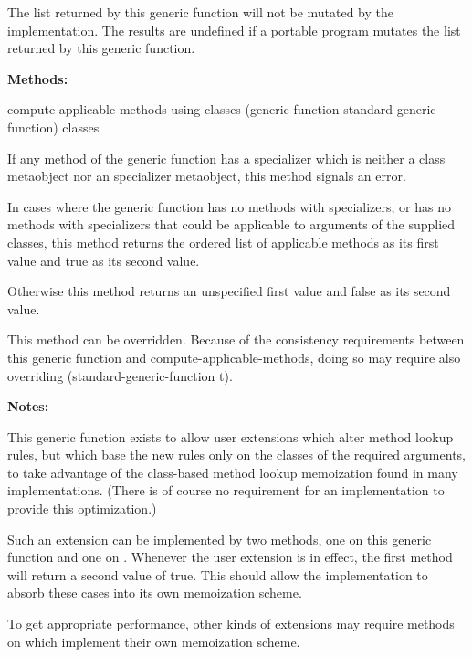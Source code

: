 \begin{defun}
The list returned by this generic function will not be mutated by the
implementation. The results are undefined if a portable program mutates the list
returned by this generic function.

\textbf{Methods:}

\begin{defun}
compute-applicable-methods-using-classes (generic-function standard-generic-function) classes

If any method of the generic function has a specializer which is neither a class
metaobject nor an  specializer metaobject, this method signals an error.

In cases where the generic function has no methods with  specializers, or has
no methods with  specializers that could be applicable to arguments of the
supplied classes, this method returns the ordered list of applicable methods as
its first value and true as its second value.

Otherwise this method returns an unspecified first value and false as its second
value.

This method can be overridden. Because of the consistency requirements between
this generic function and compute-applicable-methods, doing so may require also
overriding  (standard-generic-function t).
\end{defun}

\textbf{Notes:}

This generic function exists to allow user extensions which alter method lookup
rules, but which base the new rules only on the classes of the required
arguments, to take advantage of the class-based method lookup memoization found
in many implementations. (There is of course no requirement for an
implementation to provide this optimization.)

Such an extension can be implemented by two methods, one on this generic
function and one on . Whenever the user extension is
in effect, the first method will return a second value of true. This should
allow the implementation to absorb these cases into its own memoization scheme.

To get appropriate performance, other kinds of extensions may require methods on
 which implement their own memoization scheme.
\end{defun}

